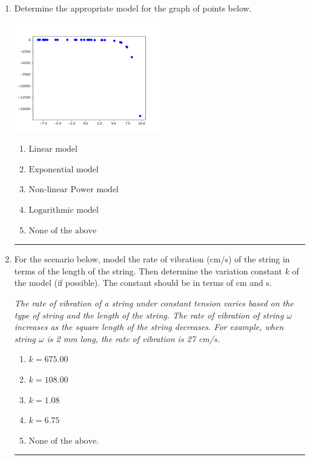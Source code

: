 \documentclass[14pt]{extbook}
\newcommand{\litem}[1]{\item#1\hspace*{-1cm}\rule{\textwidth}{0.4pt}}
\begin{document}
\begin{enumerate}
{\begin{enumerate}[label=\Alph*.]
\end{enumerate} }
\litem{
Determine the appropriate model for the graph of points below.
\begin{center}
    \includegraphics[width=0.5\textwidth]{../Figures/identifyModelGraph12CopyC.png}
\end{center}
\begin{enumerate}[label=\Alph*.]
\item \( \text{Linear model} \)
\item \( \text{Exponential model} \)
\item \( \text{Non-linear Power model} \)
\item \( \text{Logarithmic model} \)
\item \( \text{None of the above} \)

\end{enumerate} }
\litem{
For the scenario below, model the rate of vibration (cm/s) of the string in terms of the length of the string. Then determine the variation constant $k$ of the model (if possible). The constant should be in terms of cm and s.
\begin{center}
    \textit{ The rate of vibration of a string under constant tension varies based on the type of string and the length of the string. The rate of vibration of string $\omega$ increases as the square length of the string decreases. For example, when string $\omega$ is 2 mm long, the rate of vibration is 27 cm/s. }
\end{center}
\begin{enumerate}[label=\Alph*.]
\item \( k = 675.00 \)
\item \( k = 108.00 \)
\item \( k = 1.08 \)
\item \( k = 6.75 \)
\item \( \text{None of the above.} \)


\end{enumerate}}
\end{enumerate}
\end{document}
